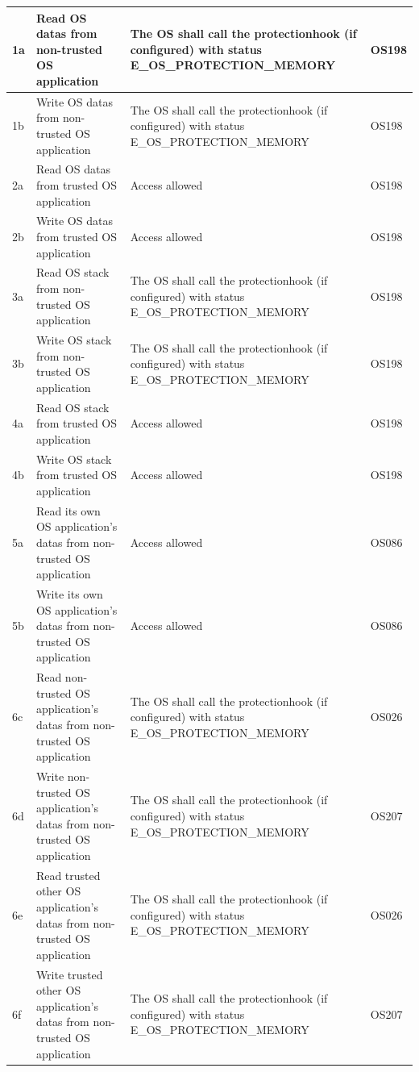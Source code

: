 \documentclass[10pt]{article}
\newlength{\Li}\settowidth{\Li}{Case}
\newlength{\Lii}\setlength{\Lii}{7cm}
\newlength{\Liii}\setlength{\Liii}{\textwidth} \addtolength{\Liii}{-\Li} \addtolength{\Liii}{-\Lii}
\newlength{\Liiii}\setlength{\Liiii}{\textwidth} \addtolength{\Liiii}{-\Li}
\begin{document}
	
	\begin{supertabular}{|p{\Li}|p{\Lii}|p{\Liii}|p{\Liiii}|} \hline
	1a	& Read OS datas from non-trusted OS application 		& The OS shall call the protectionhook (if configured) with status E\_OS\_PROTECTION\_MEMORY			& OS198 \\ \hline
	1b	& Write OS datas from non-trusted OS application 		& The OS shall call the protectionhook (if configured) with status E\_OS\_PROTECTION\_MEMORY			& OS198 \\ \hline
	2a	& Read OS datas from trusted OS application 			& Access allowed																		& OS198 \\ \hline
	2b	& Write OS datas from trusted OS application 			& Access allowed																		& OS198 \\ \hline
	3a	& Read OS stack from non-trusted OS application 		& The OS shall call the protectionhook (if configured) with status E\_OS\_PROTECTION\_MEMORY			& OS198 \\ \hline
	3b	& Write OS stack from non-trusted OS application 		& The OS shall call the protectionhook (if configured) with status E\_OS\_PROTECTION\_MEMORY			& OS198 \\ \hline
	4a	& Read OS stack from trusted OS application 			& Access allowed																		& OS198 \\ \hline
	4b	& Write OS stack from trusted OS application 			& Access allowed																		& OS198 \\ \hline
	5a	& Read its own OS application's datas from non-trusted OS application	&  Access allowed															& OS086 \\ \hline
	5b	& Write its own OS application's datas from non-trusted OS application	&  Access allowed															& OS086 \\ \hline
	
	6c	& Read non-trusted OS application's datas from non-trusted OS application	&  The OS shall call the protectionhook (if configured) with status E\_OS\_PROTECTION\_MEMORY	& OS026 \\ \hline
	6d	& Write non-trusted OS application's datas from non-trusted OS application	&  The OS shall call the protectionhook (if configured) with status E\_OS\_PROTECTION\_MEMORY	& OS207 \\ \hline
	6e	& Read trusted other OS application's datas from non-trusted OS application	&  The OS shall call the protectionhook (if configured) with status E\_OS\_PROTECTION\_MEMORY	& OS026 \\ \hline
	6f	& Write trusted other OS application's datas from non-trusted OS application	&  The OS shall call the protectionhook (if configured) with status E\_OS\_PROTECTION\_MEMORY	& OS207 \\ \hline
	

\end{supertabular}
\end{document}
